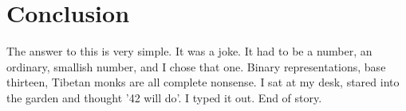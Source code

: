 \chapter{Conclusion}
The answer to this is very simple. It was a joke. It had to be a number, an ordinary, smallish number, and I chose that one. Binary representations, base thirteen, Tibetan monks are all complete nonsense. I sat at my desk, stared into the garden and thought '42 will do'. I typed it out. End of story.